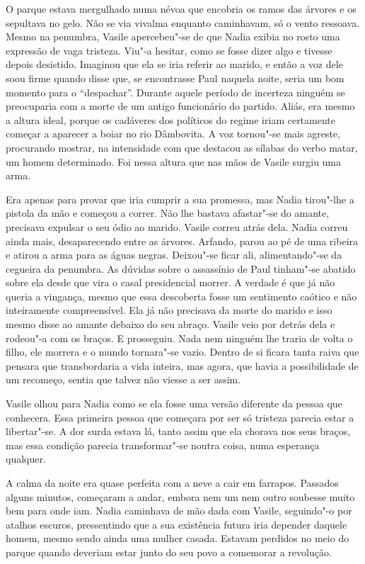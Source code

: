 O parque estava mergulhado numa névoa que encobria os ramos das árvores
e os sepultava no gelo. Não se via vivalma enquanto caminhavam, só o
vento ressoava. Mesmo na penumbra, Vasile apercebeu"-se de que Nadia
exibia no rosto uma expressão de vaga tristeza. Viu"-a hesitar, como se
fosse dizer algo e tivesse depois desistido. Imaginou que ela se iria
referir ao marido, e então a voz dele soou firme quando disse que, se
encontrasse Paul naquela noite, seria um bom momento para o ``despachar''. Durante aquele período de incerteza ninguém se preocuparia com a
morte de um antigo funcionário do partido. Aliás, era mesmo a altura
ideal, porque os cadáveres dos políticos do regime iriam certamente
começar a aparecer a boiar no rio Dâmbovita. A voz tornou"-se mais
agreste, procurando mostrar, na intensidade com que destacou as
sílabas do verbo matar, um homem determinado. Foi nessa altura que nas
mãos de Vasile surgiu uma arma.

Era apenas para provar que iria cumprir
a sua promessa, mas Nadia tirou"-lhe a pistola da mão e começou a
correr. Não lhe bastava afastar"-se do amante, precisava expulsar o
seu ódio ao marido. Vasile correu atrás dela. Nadia correu ainda mais,
desaparecendo entre as árvores. Arfando, parou ao pé de uma ribeira e
atirou a arma para as águas negras. Deixou"-se ficar ali, alimentando"-se
da cegueira da penumbra. As dúvidas sobre o assassínio de Paul tinham"-se
abatido sobre ela desde que vira o casal presidencial morrer. A verdade
é que já não queria a vingança, mesmo que essa descoberta fosse um
sentimento
caótico e não inteiramente compreensível. Ela já não precisava da
morte do marido e isso mesmo disse ao amante debaixo do seu abraço.
Vasile veio por detrás dela e rodeou"-a com os braços. E prosseguiu. Nada
nem ninguém lhe traria de volta o filho, ele morrera e o mundo tornara"-se vazio. Dentro de si ficara tanta raiva que pensara que transbordaria
a vida inteira, mas agora, que havia a possibilidade de um recomeço,
sentia que talvez não viesse a ser assim.

Vasile olhou para Nadia como se ela fosse uma versão diferente da pessoa
que conhecera. Essa primeira pessoa que começara por ser só tristeza
parecia estar a libertar"-se. A dor surda estava lá, tanto assim que ela
chorava nos seus braços, mas essa condição parecia transformar"-se noutra
coisa, numa esperança qualquer.

A calma da noite era quase perfeita com a neve a cair em farrapos.
Passados alguns minutos, começaram a andar, embora nem um nem outro
soubesse muito bem para onde iam. Nadia caminhava de mão dada com
Vasile, seguindo"-o por atalhos escuros, pressentindo que a sua
existência futura iria depender daquele homem, mesmo sendo ainda uma
mulher casada. Estavam perdidos no meio do parque quando deveriam estar
junto do seu povo a comemorar a revolução.

